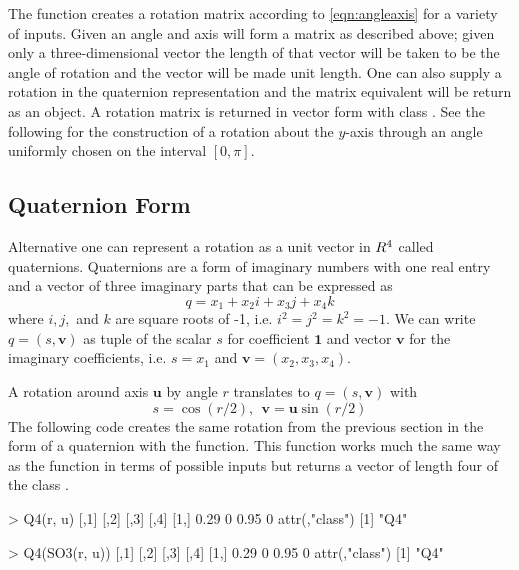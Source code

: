 The function  creates a rotation matrix according to \eqref{eqn:angleaxis} for a variety of inputs.  Given an angle and axis  will form a matrix as described above; given only a three-dimensional vector the length of that vector will be taken to be the angle of rotation and the vector will be made unit length.  One can also supply a rotation in the quaternion representation and the matrix equivalent will be return as an  object.  A rotation matrix is returned in vector form with class .  See the following for the construction of a rotation about the $y$-axis through an angle uniformly chosen on the interval $[0,\pi]$.


\subsection{Quaternion Form}

Alternative one can represent a rotation as a unit vector in $R^4$ called quaternions.  Quaternions are a form of imaginary numbers with one real entry and a vector of three imaginary parts that can be expressed as
\[
q = x_1 + x_2 i + x_3 j + x_4 k
\]
where $i,j,$ and $k$ are square roots of -1, i.e. $i^2 = j^2= k^2 = -1$.  We can write $q=(s,\bm v)$ as tuple of the scalar $s$ for coefficient $\bm 1$ and vector $\bm v$ for the imaginary coefficients, i.e. $s=x_1$ and $\bm v= (x_2, x_3, x_4)$.

A rotation around axis $\bm u$ by angle $r$ translates to $q=(s,\bm v)$ with
\[
s = \cos{(r/2)},  \ \ \bm v = \bm u \sin {(r/2)}
\]
The following code creates the same rotation from the previous section in the form of a quaternion with the  function.  This function works much the same way as the  function in terms of possible inputs but returns a vector of length four of the class . 

\begin{example}
> Q4(r, u)
     [,1] [,2] [,3]  [,4]
[1,] 0.29    0 0.95     0
attr(,"class")
[1] "Q4"

> Q4(SO3(r, u))
     [,1] [,2] [,3]  [,4]
[1,] 0.29    0 0.95     0
attr(,"class")
[1] "Q4"
\end{example}


